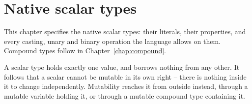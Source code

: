 \chapter{Native scalar types}
\label{chap:scalars}

This chapter specifies the native scalar types: their literals, their
properties, and every casting, unary and binary operation the language allows on
them. Compound types follow in Chapter~\ref{chap:compound}.

A scalar type holds exactly one value, and borrows nothing from any other. It
follows that a scalar cannot be mutable in its own right -- there is nothing
inside it to change independently. Mutability reaches it from outside instead,
through a mutable variable holding it, or through a mutable compound type
containing it.

\minitoc%






